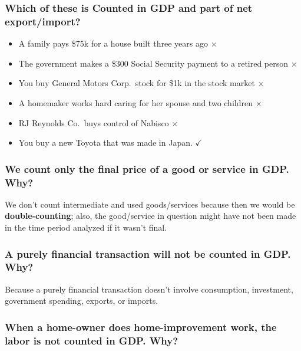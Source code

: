 \documentclass[
  letterpaper,
  DIV=11,
  numbers=noendperiod]{scrartcl}
\providecommand{\tightlist}{%
  \setlength{\itemsep}{0pt}\setlength{\parskip}{0pt}}\usepackage{longtable,booktabs,array}
\begin{document}
\subsubsection{Which of these is Counted in GDP and part of net
export/import?}\label{which-of-these-is-counted-in-gdp-and-part-of-net-exportimport}

\begin{itemize}
\tightlist
\item
  A family pays \$75k for a house built three years ago \(\times\)
\item
  The government makes a \$300 Social Security payment to a retired
  person \(\times\)
\item
  You buy General Motors Corp.~stock for \$1k in the stock market
  \(\times\)
\item
  A homemaker works hard caring for her spouse and two children
  \(\times\)
\item
  RJ Reynolds Co.~buys control of Nabisco \(\times\)
\item
  You buy a new Toyota that was made in Japan. \(\checkmark\)
\end{itemize}

\subsubsection{We count only the final price of a good or service in
GDP.
Why?}\label{we-count-only-the-final-price-of-a-good-or-service-in-gdp.-why}

We don't count intermediate and used goods/services because then we
would be \textbf{double-counting}; also, the good/service in question
might have not been made in the time period analyzed if it wasn't final.

\subsubsection{A purely financial transaction will not be counted in
GDP.
Why?}\label{a-purely-financial-transaction-will-not-be-counted-in-gdp.-why}

Because a purely financial transaction doesn't involve consumption,
investment, government spending, exports, or imports.

\subsubsection{When a home-owner does home-improvement work, the labor
is not counted in GDP.
Why?}\label{when-a-home-owner-does-home-improvement-work-the-labor-is-not-counted-in-gdp.-why}
\end{document}
